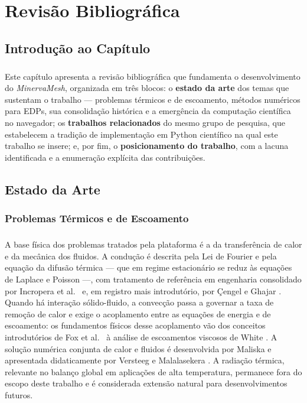 \chapter{Revisão Bibliográfica}
\label{cap2}

\section{Introdução ao Capítulo}
\label{sec:revbiblio_intro}

\paragraph{}Este capítulo apresenta a revisão bibliográfica que fundamenta o desenvolvimento do \textit{MinervaMesh}, organizada em três blocos: o \textbf{estado da arte} dos temas que sustentam o trabalho --- problemas térmicos e de escoamento, métodos numéricos para EDPs, sua consolidação histórica e a emergência da computação científica no navegador; os \textbf{trabalhos relacionados} do mesmo grupo de pesquisa, que estabelecem a tradição de implementação em Python científico na qual este trabalho se insere; e, por fim, o \textbf{posicionamento do trabalho}, com a lacuna identificada e a enumeração explícita das contribuições.

\section{Estado da Arte}
\label{sec:estado_da_arte}

\subsection{Problemas Térmicos e de Escoamento}
\paragraph{}A base física dos problemas tratados pela plataforma é a da transferência de calor e da mecânica dos fluidos. A condução é descrita pela Lei de Fourier e pela equação da difusão térmica --- que em regime estacionário se reduz às equações de Laplace e Poisson ---, com tratamento de referência em engenharia consolidado por Incropera et al.\ \cite{Incropera2006} e, em registro mais introdutório, por Çengel e Ghajar \cite{Cengel2015}. Quando há interação sólido-fluido, a convecção passa a governar a taxa de remoção de calor e exige o acoplamento entre as equações de energia e de escoamento: os fundamentos físicos desse acoplamento vão dos conceitos introdutórios de Fox et al.\ \cite{Fox2012} à análise de escoamentos viscosos de White \cite{White2006}. A solução numérica conjunta de calor e fluidos é desenvolvida por Maliska \cite{Maliska2004} e apresentada didaticamente por Versteeg e Malalasekera \cite{Versteeg2007}. A radiação térmica, relevante no balanço global em aplicações de alta temperatura, permanece fora do escopo deste trabalho e é considerada extensão natural para desenvolvimentos futuros.

